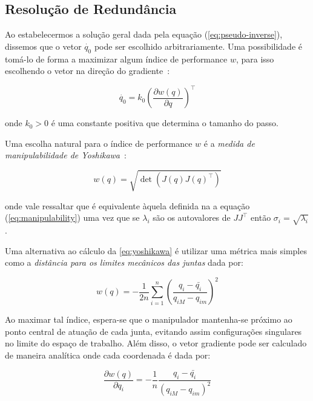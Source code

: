 \subsection{Resolução de Redundância}

Ao estabelecermos a solução geral dada pela equação (\ref{eq:pseudo-inverse}),
dissemos que o vetor \(\dot{q_0}\) pode ser escolhido arbitrariamente. Uma
possibilidade é tomá-lo de forma a maximizar algum índice de performance \(w\),
para isso escolhendo o vetor na direção do gradiente~\cite{siciliano_robotics_2009}:

\begin{equation}\label{eq:metric-gradient}
    \dot{q_0} = k_0 {\left( \frac{\partial w(q)}{\partial q} \right)}^\top
\end{equation}

onde \(k_0 > 0\) é uma constante positiva que determina o tamanho do passo.

Uma escolha natural para o índice de performance \(w\) é a \emph{medida de
    manipulabilidade de Yoshikawa}~\cite{yoshikawa1983}:

\begin{equation}\label{eq:yoshikawa}
    w(q) = \sqrt{\det(J(q){J(q)}^\top)}
\end{equation}

onde vale ressaltar que é equivalente àquela definida na a equação
(\ref{eq:manipulability}) uma vez que se \(\lambda_i\) são os autovalores de
\(J J^\top\) então \(\sigma_i = \sqrt{\lambda_i}\).

Uma alternativa ao cálculo da \ref{eq:yoshikawa} é utilizar uma métrica mais simples como a
\emph{distância para os limites mecânicos das juntas} dada por:

\begin{equation}
    w(q) = -\frac{1}{2n} \sum_{i=1}^{n}{{\left(\frac{q_i - \bar{q_i}}{q_{iM} - q_{im}}\right)}^2}
\end{equation}

Ao maximar tal índice, espera-se que o manipulador mantenha-se próximo ao ponto
central de atuação de cada junta, evitando assim configurações singulares no
limite do espaço de trabalho. Além disso, o vetor gradiente pode ser calculado
de maneira analítica onde cada coordenada é dada por:

\begin{equation}\label{eq:joint-distance-grad}
    \frac{\partial w(q)}{\partial q_i} = -\frac{1}{n} \frac{q_i - \bar{q_i}}{{(q_{iM} - q_{im})}^2}
\end{equation}

